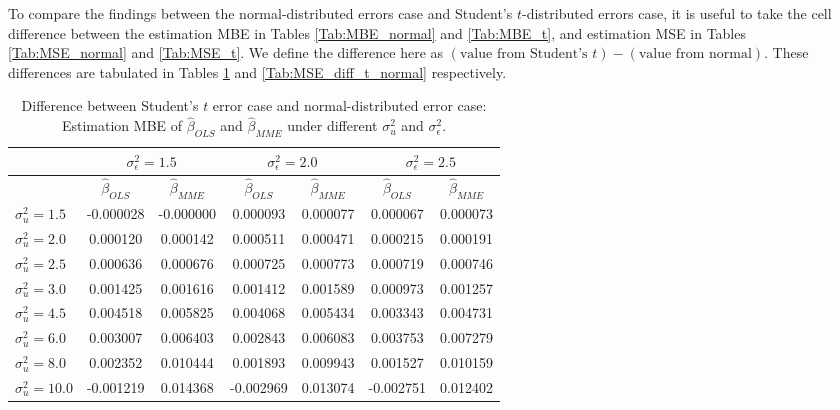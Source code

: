 \documentclass{article}
\begin{document}

To compare the findings between the normal-distributed errors case and Student's $t$-distributed errors case,
it is useful to take the cell difference between the estimation MBE in Tables \ref{Tab:MBE_normal} and \ref{Tab:MBE_t},
and estimation MSE in Tables \ref{Tab:MSE_normal} and \ref{Tab:MSE_t}.
We define the difference here as $(\textrm{value from Student's } t) - (\textrm{value from normal})$. 
These differences are tabulated in Tables \ref{Tab:MBE_diff_t_normal} and \ref{Tab:MSE_diff_t_normal} respectively.

\begin{table}[ht]
    \centering
    \caption{Difference between Student's $t$ error case and normal-distributed error case: Estimation MBE of $\hat{\beta}_{OLS}$ and $\hat{\beta}_{MME}$ under different $\sigma^2_u$ and $\sigma^2_\epsilon$.}
    \label{Tab:MBE_diff_t_normal}
    \begin{tabular}[t]{lcccccc}
        \hline
        &\multicolumn{2}{c}{$\sigma^2_\epsilon=1.5$}&\multicolumn{2}{c}{$\sigma^2_\epsilon=2.0$}&\multicolumn{2}{c}{$\sigma^2_\epsilon=2.5$}\\
        \hline
        &$\hat{\beta}_{OLS}$&$\hat{\beta}_{MME}$&$\hat{\beta}_{OLS}$&$\hat{\beta}_{MME}$&$\hat{\beta}_{OLS}$&$\hat{\beta}_{MME}$\\
        \hline
        $\sigma^2_u = 1.5$&-0.000028&-0.000000&0.000093&0.000077&0.000067&0.000073\\
        $\sigma^2_u = 2.0$&0.000120&0.000142&0.000511&0.000471&0.000215&0.000191\\
        $\sigma^2_u = 2.5$&0.000636&0.000676&0.000725&0.000773&0.000719&0.000746\\
        $\sigma^2_u = 3.0$&0.001425&0.001616&0.001412&0.001589&0.000973&0.001257\\
        $\sigma^2_u = 4.5$&0.004518&0.005825&0.004068&0.005434&0.003343&0.004731\\
        $\sigma^2_u = 6.0$&0.003007&0.006403&0.002843&0.006083&0.003753&0.007279\\
        $\sigma^2_u = 8.0$&0.002352&0.010444&0.001893&0.009943&0.001527&0.010159\\
        $\sigma^2_u = 10.0$&-0.001219&0.014368&-0.002969&0.013074&-0.002751&0.012402\\
    \end{tabular}
\end{table}
\end{document}
